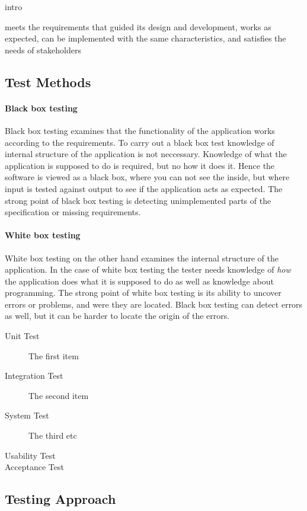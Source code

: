 
intro

meets the requirements that guided its design and development,
works as expected,
can be implemented with the same characteristics,
and satisfies the needs of stakeholders

\subsection{Test Methods}

\paragraph{Black box testing}

Black box testing examines that the functionality of the application works according to the requirements. To carry out a black box test knowledge of internal structure of the application is not neccessary. Knowledge of what the application is supposed to do is required, but no how it does it. Hence the software is viewed as a black box, where you can not see the inside, but where input is tested against output to see if the application acts as expected. The strong point of black box testing is detecting unimplemented parts of the specification or missing requirements.

\paragraph{White box testing}

White box testing on the other hand examines the internal structure of the application. In the case of white box testing the tester needs knowledge of \emph{how} the application does what it is supposed to do as well as knowledge about programming. The strong point of white box testing is its ability to uncover errors or problems, and were they are located. Black box testing can detect errors as well, but it can be harder to locate the origin of the errors.

\begin{description}
  \item[Unit Test] The first item
  \item[Integration Test] The second item
  \item[System Test] The third etc
  \item[Usability Test]
  \item[Acceptance Test]
\end{description}


\subsection{Testing Approach}

